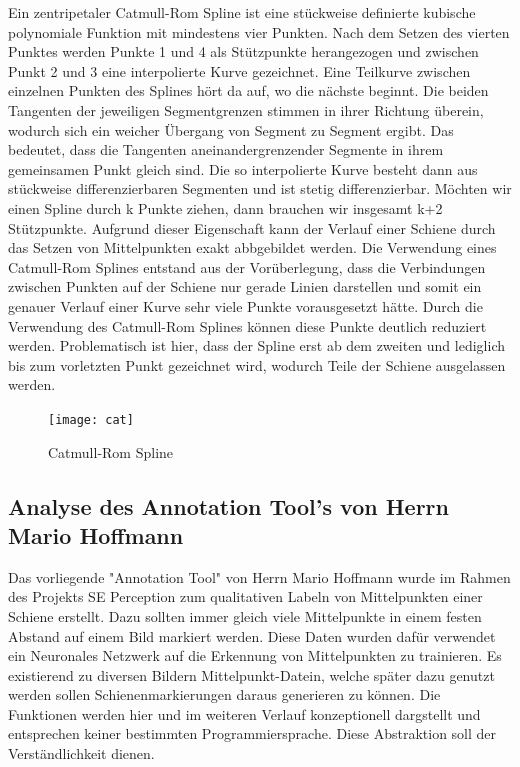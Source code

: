 \documentclass[11pt]{scrartcl}
\begin{document}
\noindent
Ein zentripetaler Catmull-Rom Spline ist eine stückweise definierte kubische polynomiale Funktion mit mindestens vier Punkten. Nach dem
Setzen des vierten Punktes werden Punkte 1 und 4 als Stützpunkte herangezogen
und zwischen Punkt 2 und 3 eine interpolierte Kurve gezeichnet. Eine Teilkurve zwischen einzelnen Punkten des Splines hört da auf, wo die nächste beginnt. Die beiden Tangenten der jeweiligen Segmentgrenzen stimmen in ihrer Richtung überein, wodurch sich ein weicher Übergang von Segment zu Segment ergibt. Das bedeutet, dass die Tangenten aneinandergrenzender Segmente in ihrem gemeinsamen Punkt gleich sind. Die so interpolierte Kurve besteht dann aus stückweise differenzierbaren Segmenten und ist stetig differenzierbar. 
Möchten wir einen Spline durch k Punkte ziehen, dann brauchen wir insgesamt k+2 Stützpunkte. Aufgrund dieser Eigenschaft kann der Verlauf einer Schiene durch das Setzen von Mittelpunkten exakt abbgebildet werden. Die Verwendung eines Catmull-Rom Splines entstand aus der Vorüberlegung, dass die Verbindungen zwischen Punkten auf der Schiene nur gerade Linien darstellen und somit ein genauer Verlauf einer Kurve sehr viele Punkte vorausgesetzt hätte. Durch die Verwendung des Catmull-Rom Splines können diese Punkte deutlich reduziert werden. Problematisch ist hier, dass der Spline erst ab dem zweiten und lediglich bis zum vorletzten Punkt gezeichnet wird, wodurch Teile der Schiene ausgelassen werden.

\begin{figure}[H]
  \texttt{[image: cat]}
  \caption{Catmull-Rom Spline}
\end{figure}


\subsection{Analyse des Annotation Tool's von Herrn Mario Hoffmann}
\label{sec:Analyse des Annotation Tool's von Herrn Mario Hoffmann}

Das vorliegende "Annotation Tool" von Herrn Mario Hoffmann wurde im Rahmen des Projekts SE Perception zum qualitativen Labeln von Mittelpunkten einer Schiene erstellt. Dazu sollten immer gleich viele Mittelpunkte in einem festen Abstand auf einem Bild markiert werden. Diese Daten wurden dafür verwendet ein Neuronales Netzwerk auf die Erkennung von Mittelpunkten zu trainieren. Es existierend zu diversen Bildern Mittelpunkt-Datein, welche später dazu genutzt werden sollen Schienenmarkierungen daraus generieren zu können. Die Funktionen werden hier und im weiteren Verlauf konzeptionell dargstellt und entsprechen keiner bestimmten Programmiersprache. Diese Abstraktion soll der Verständlichkeit dienen.
\end{document}
